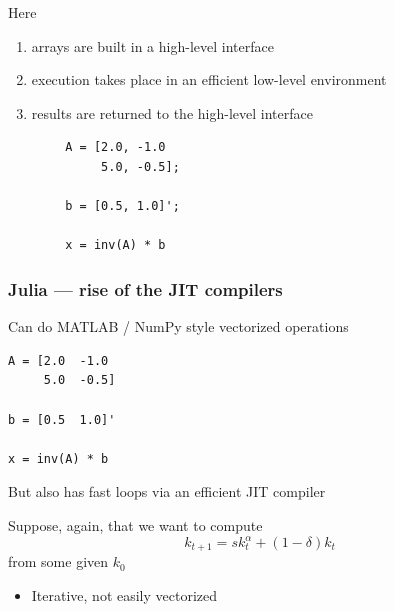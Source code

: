 \begin{frame}[fragile]

    Here
    \begin{enumerate}
        \item arrays are built in a high-level interface
        \item execution takes place in an efficient low-level environment
        \item results are returned to the high-level interface
    \end{enumerate}
    
    \begin{verbatim}
        A = [2.0, -1.0
             5.0, -0.5];

        b = [0.5, 1.0]';

        x = inv(A) * b
    \end{verbatim}

    
\end{frame}



\begin{frame}[fragile]
    \frametitle{Julia --- rise of the JIT compilers}

    Can do MATLAB / NumPy style vectorized operations

    \begin{verbatim}
A = [2.0  -1.0
     5.0  -0.5]

b = [0.5  1.0]'

x = inv(A) * b
    \end{verbatim}
    
\end{frame}


\begin{frame}
    
    But also has fast loops via an efficient JIT compiler

    \vspace{0.5em}
    \vspace{0.5em}
    \Eg Suppose, again, that we want to compute 
    \begin{equation*}
        k_{t+1} = s k_t^\alpha + (1 - \delta) k_t
    \end{equation*}
    from some given $k_0$ 


    \vspace{0.5em}
    \vspace{0.5em}
    \vspace{0.5em}
    \vspace{0.5em}
    \begin{itemize}
        \item Iterative, not easily vectorized
    \end{itemize}

\end{frame}


